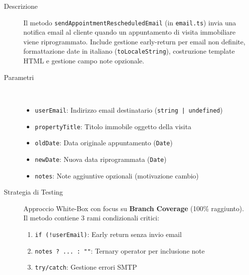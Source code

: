\begin{description}
    \item[Descrizione] Il metodo \texttt{sendAppointmentRescheduledEmail} (in \texttt{email.ts}) invia una notifica email al cliente quando un appuntamento di visita immobiliare viene riprogrammato. Include gestione early-return per email non definite, formattazione date in italiano (\texttt{toLocaleString}), costruzione template HTML e gestione campo note opzionale.
    
    \item[Parametri] ~\\
    \begin{itemize}
        \item \texttt{userEmail}: Indirizzo email destinatario (\texttt{string | undefined})
        \item \texttt{propertyTitle}: Titolo immobile oggetto della visita
        \item \texttt{oldDate}: Data originale appuntamento (\texttt{Date})
        \item \texttt{newDate}: Nuova data riprogrammata (\texttt{Date})
        \item \texttt{notes}: Note aggiuntive opzionali (motivazione cambio)
    \end{itemize}
    
    \item[Strategia di Testing] Approccio White-Box con focus su \textbf{Branch Coverage} (100\% raggiunto). Il metodo contiene 3 rami condizionali critici:
    \begin{enumerate}
        \item \texttt{if (!userEmail)}: Early return senza invio email
        \item \texttt{notes ? ... : ""}: Ternary operator per inclusione note
        \item \texttt{try/catch}: Gestione errori SMTP
    \end{enumerate}
    

\end{description}
